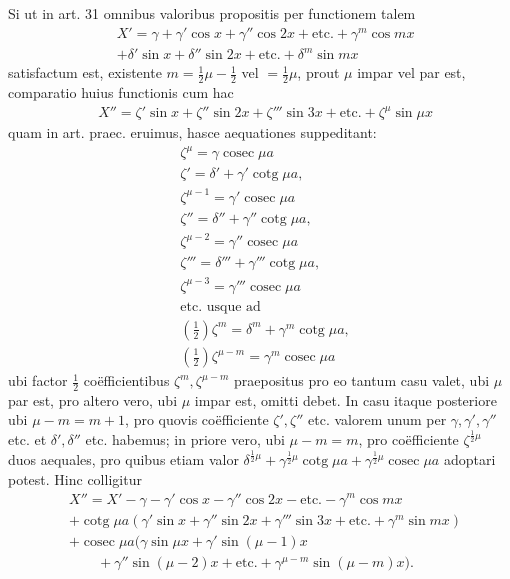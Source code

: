 Si ut in art. 31 omnibus valoribus propositis per functionem talem
\[
\begin{aligned}
&X'={}\gamma+\gamma'\cos x+\gamma''\cos 2x+\text{etc.}+\gamma^{m}\cos mx\\[5pt]
&+\delta'\sin x+\delta''\sin 2x+\text{etc.}+\delta^{m}\sin mx
\end{aligned}
\]
satisfactum est, existente $m=\tfrac{1}{2}\mu-\tfrac{1}{2}$ vel $=\tfrac{1}{2}\mu$, prout $\mu$ impar vel par est, comparatio huius functionis cum hac
\[
\begin{aligned}
&X''=\zeta'\sin x+\zeta''\sin 2x+\zeta'''\sin 3x+\text{etc.}+\zeta^{\mu}\sin\mu x
\end{aligned}
\]
quam in art. praec. eruimus, hasce aequationes suppeditant:
\[
\begin{aligned}
&\zeta^{\mu}=\gamma\operatorname{cosec}\mu a\\[5pt]
&\zeta'=\delta'+\gamma'\operatorname{cotg}\mu a,\\[5pt]
&\zeta^{\mu-1}=\gamma'\operatorname{cosec}\mu a\\[5pt]
&\zeta''=\delta''+\gamma''\operatorname{cotg}\mu a,\\[5pt]
&\zeta^{\mu-2}=\gamma''\operatorname{cosec}\mu a\\[5pt]
&\zeta'''=\delta'''+\gamma'''\operatorname{cotg}\mu a,\\[5pt]
&\zeta^{\mu-3}=\gamma'''\operatorname{cosec}\mu a\\[5pt]
&\text{etc. usque ad}\\[5pt]
&(\tfrac{1}{2})\zeta^{m}=\delta^{m}+\gamma^{m}\operatorname{cotg}\mu a,\\[5pt]
&(\tfrac{1}{2})\zeta^{\mu-m}=\gamma^{m}\operatorname{cosec}\mu a
\end{aligned}
\]
ubi factor $\tfrac{1}{2}$ coëfficientibus $\zeta^{m},\zeta^{\mu-m}$ praepositus pro eo tantum casu valet, ubi $\mu$ par est, pro altero vero, ubi $\mu$ impar est, omitti debet. In casu itaque posteriore ubi $\mu-m=m+1$, pro quovis coëfficiente $\zeta',\zeta''$ etc. valorem unum per $\gamma,\gamma',\gamma''$ etc. et $\delta',\delta''$ etc. habemus; in priore vero, ubi $\mu-m=m$, pro coëfficiente $\zeta^{\frac{1}{2}\mu}$ duos aequales, pro quibus etiam valor $\delta^{\frac{1}{2}\mu}+\gamma^{\frac{1}{2}\mu}\operatorname{cotg}\mu a+\gamma^{\frac{1}{2}\mu}\operatorname{cosec}\mu a$ adoptari potest. Hinc colligitur
\[
\begin{aligned}
&X''={}X'-\gamma-\gamma'\cos x-\gamma''\cos 2x-\text{etc.}-\gamma^{m}\cos mx\\[5pt]
&+\operatorname{cotg}\mu a(\gamma'\sin x+\gamma''\sin 2x+\gamma'''\sin 3x+\text{etc.}+\gamma^{m}\sin mx)\\[5pt]
&+\operatorname{cosec}\mu a(\gamma\sin\mu x+\gamma'\sin(\mu-1)x\\[5pt]
&\qquad{}+\gamma''\sin(\mu-2)x+\text{etc.}+\gamma^{\mu-m}\sin(\mu-m)x).
\end{aligned}
\]
